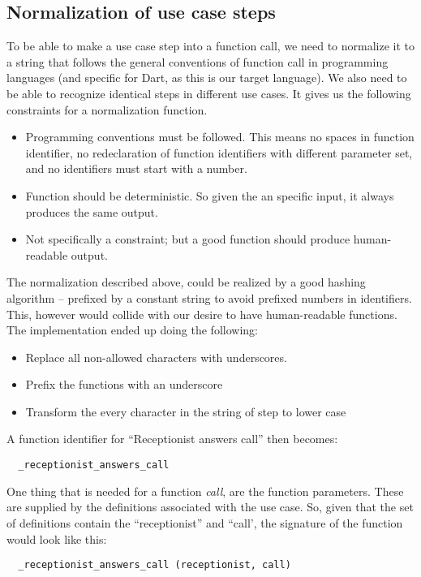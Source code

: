 \subsection{Normalization of use case steps}
To be able to make a use case step into a function call, we need to normalize it to a string that follows the general conventions of function call in programming languages (and specific for Dart, as this is our target language). We also need to be able to recognize identical steps in different use cases. It gives us the following constraints for a normalization function.
\begin{itemize}
  \item Programming conventions must be followed. This means no spaces in function identifier, no redeclaration of function identifiers with different parameter set, and no identifiers must start with a number.
  \item Function should be deterministic. So given the an specific input, it always produces the same output.
  \item Not specifically a constraint; but a good function should produce human-readable output.
\end{itemize}
The normalization described above, could be realized by a good hashing algorithm -- prefixed by a constant string to avoid prefixed numbers in identifiers. This, however would collide with our desire to have human-readable functions. The implementation ended up doing the following:
\begin{itemize}
  \item Replace all non-allowed characters with underscores.
  \item Prefix the functions with an underscore
  \item Transform the every character in the string of step to lower case
\end{itemize}
A function identifier for ``Receptionist answers call'' then becomes:
\begin{verbatim}
  _receptionist_answers_call
\end{verbatim}
One thing that is needed for a function \emph{call}, are the function parameters. These are supplied by the definitions associated with the use case. So, given that the set of definitions contain the ``receptionist'' and ``call', the signature of the function would look like this:
\begin{verbatim}
  _receptionist_answers_call (receptionist, call)
\end{verbatim}

